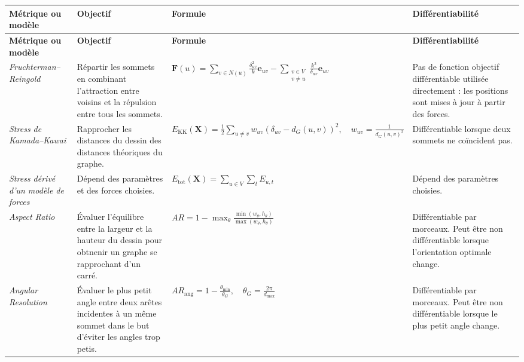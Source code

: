 \documentclass[a4paper,11pt]{article}
\begin{document}
\small
\renewcommand{\arraystretch}{1.7}
\begin{longtable}{|p{2.1cm}|p{2.8cm}|p{7.1cm}|p{3.1cm}|}
\hline
\textbf{Métrique ou modèle} &
\textbf{Objectif} &
\textbf{Formule} &
\textbf{Différentiabilité} \\
\hline
\endfirsthead

\hline
\textbf{Métrique ou modèle} &
\textbf{Objectif} &
\textbf{Formule} &
\textbf{Différentiabilité} \\
\hline
\endhead

\textit{Fruchterman--Reingold}
&
Répartir les sommets en combinant l'attraction entre voisins et la répulsion entre tous les sommets.
&
$\displaystyle \mathbf{F}(u)=
\sum_{v\in N(u)}\frac{\delta_{uv}^2}{k}\mathbf{e}_{uv}
-\sum_{\substack{v\in V\\v\neq u}}
\frac{k^2}{\delta_{uv}}\mathbf{e}_{uv}$
&
Pas de fonction objectif différentiable utilisée directement : les positions sont mises à jour à partir des forces. \\
\hline

\textit{Stress de Kamada--Kawai}
&
Rapprocher les distances du dessin des distances théoriques du graphe.
&
$\displaystyle E_{\mathrm{KK}}(\mathbf{X})=
\frac{1}{2}\sum_{u\neq v}
w_{uv}(\delta_{uv}-d_G(u,v))^2,
\quad w_{uv}=\frac{1}{d_G(u,v)^2}$
&
Différentiable lorsque deux sommets ne coïncident pas. \\
\hline

\textit{Stress dérivé d'un modèle de forces}
&
Dépend des paramètres et des forces choisies.
&
$\displaystyle E_{\mathrm{tot}}(\mathbf{X})=
\sum_{u\in V}\sum_t E_{u,t}$
&
Dépend des paramètres choisies. \\
\hline

\textit{Aspect Ratio}
&
Évaluer l'équilibre entre la largeur et la hauteur du dessin pour obtnenir un graphe se rapprochant d'un carré.
&
$\displaystyle AR=1-\max_{\theta} \frac{\min(w_\theta,h_\theta)}{\max(w_\theta,h_\theta)}$
&
Différentiable par morceaux. Peut être non différentiable lorsque l’orientation optimale change. \\
\hline

\textit{Angular Resolution}
&
Évaluer le plus petit angle entre deux arêtes incidentes à un même sommet dans le but d'éviter les angles trop petis.
&
$\displaystyle AR_{\mathrm{ang}}=1-\frac{\theta_{\min}}{\theta_G}, \quad \theta_G=\frac{2\pi}{d_{\max}}$
&
Différentiable par morceaux. Peut être non différentiable lorsque le plus petit angle change. \\
\hline


\end{longtable}
\end{document}
